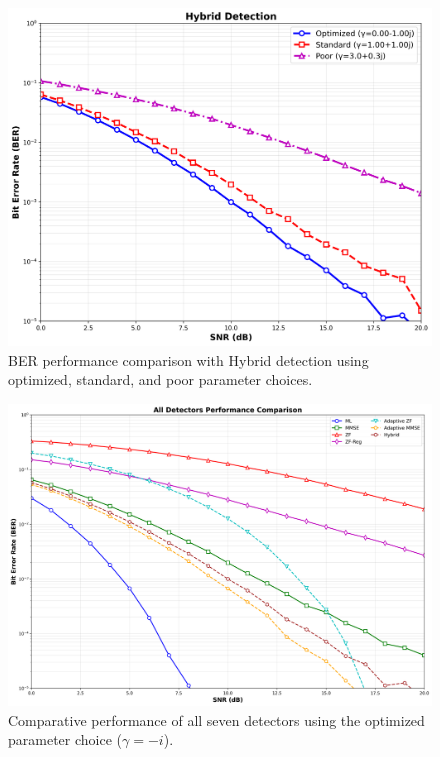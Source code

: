 \begin{figure}[!t]
\centering
\includegraphics[width=0.9\columnwidth]{figures/hybrid_detection.png}
\caption{BER performance comparison with Hybrid detection using optimized, standard, and poor parameter choices.}
\label{fig:hybrid_plot}
\end{figure}

\begin{figure}[!t]
\centering
\includegraphics[width=0.9\columnwidth]{figures/all_detectors_comparison.png}
\caption{Comparative performance of all seven detectors using the optimized parameter choice (\(\gamma = -i\)).}
\label{fig:all_detectors}
\end{figure}

